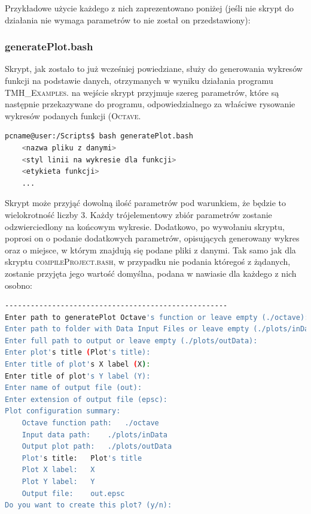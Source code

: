
Przykładowe użycie każdego z nich zaprezentowano poniżej (jeśli nie skrypt do działania nie wymaga parametrów to nie został on przedstawiony):

\subsubsection{generatePlot.bash}

Skrypt, jak zostało to już wcześniej powiedziane, służy do generowania wykresów funkcji na podstawie danych, otrzymanych w wyniku działania programu \textsc{TMH\_Examples}. na wejście skrypt przyjmuje szereg parametrów, które są następnie przekazywane do programu, odpowiedzialnego za właściwe rysowanie wykresów podanych funkcji (\textsc{Octave}.

\begin{lstlisting}[language=bash]
pcname@user:/Scripts$ bash generatePlot.bash 
	<nazwa pliku z danymi>
	<styl linii na wykresie dla funkcji>
	<etykieta funkcji>
	...
\end{lstlisting}

Skrypt może przyjąć dowolną ilość parametrów pod warunkiem, że będzie to wielokrotność liczby $3$. Każdy trójelementowy zbiór parametrów zostanie odzwierciedlony na końcowym wykresie. Dodatkowo, po wywołaniu skryptu, poprosi on o podanie dodatkowych parametrów, opisujących generowany wykres oraz o miejsce, w którym znajdują się podane pliki z danymi. Tak samo jak dla skryptu \textsc{compileProject.bash}, w przypadku nie podania któregoś z żądanych, zostanie przyjęta jego wartość domyślna, podana w nawiasie dla każdego z nich osobno:

\small
\begin{lstlisting}[language=bash]
----------------------------------------------------
Enter path to generatePlot Octave's function or leave empty (./octave):
Enter path to folder with Data Input Files or leave empty (./plots/inData):
Enter full path to output or leave empty (./plots/outData):
Enter plot's title (Plot's title):
Enter title of plot's X label (X):
Enter title of plot's Y label (Y):
Enter name of output file (out):
Enter extension of output file (epsc):
Plot configuration summary: 
	Octave function path:	./octave
	Input data path:	./plots/inData
	Output plot path:	./plots/outData
	Plot's title:	Plot's title
	Plot X label:	X
	Plot Y label:	Y
	Output file:	out.epsc
Do you want to create this plot? (y/n):
\end{lstlisting}
\normalsize

